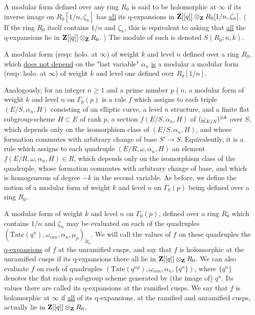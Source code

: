 A modular form defined over any ring $R_0$ is said to be holomorphic at
$\infty$ if its inverse image on $R_0[1/n,\zeta_n]$ has \uline{all} its
q-expansions in $\mathbf{Z}[[q]]\otimes_{\mathbf{Z}} R_0[1/n,\zeta_n]$. $\bigl\langle$ If the ring
$R_0$ itself contains $1/n$ and $\zeta_n$, this is equivalent to asking that
\uline{all} the q-expansions lie in $\mathbf{Z}[[q]]\otimes_{\mathbf{Z}} R_0$. $\bigr\rangle$ The
module of such is denoted $S(R_0;n,k)$.

A modular form (resp: holo. at $\infty$) of weight $k$ and level $n$ defined
over a ring $R_0$, which \uline{does not depend} on the "last variable"
$\alpha_n$ \uline{is} a modular a modular form (resp: holo. at $\infty$) of
weight $k$ and level one defined over $R_0[1/n]$.


Analogously, for an integer $n\geq 1$ and a prime number $p\nmid n$, a modular
form of weight $k$ and level $n$ on $\Gamma_0(p)$ is a rule $f$ which assigns
to each triple $(E/S,\alpha_n,H)$ consisting of an elliptic curve, a level $n$
structure, and a finite flat subgroup-scheme $H\subset E$ of rank $p$, a
section $f(E/S,\alpha_n,H)$ of $(\underline{\omega}_{E/S})^{\otimes k}$ over $S$, which depends
only on the isomorphism class of $(E/S,\alpha_n,H)$, and whose formation
commutes with arbitrary change of base $S'\to S$. Equivalently, it is a rule
which assigns to each quadruple $(E/R,\omega,\alpha_n,H)$ an element
$f(E/R,\omega,\alpha_n,H)\in R$, which depends only on the isomorphism class of
the quadruple, whose formation commutes with arbitrary change of base, and
which is homogeneous of degree $-k$ in the second variable. As before, we
define the notion of a modular form of weight $k$ and level $n$ on
$\Gamma_0(p)$ being defined over a ring $R_0$.

A modular form of weight $k$ and level $n$ on $\Gamma_0(p)$, defined over a ring
$R_0$ which contains $1/n$ and $\zeta_n$ may be evaluated on each of the
quadruples $(\mathrm{Tate}(q^n),\omega_{can},\alpha_n,\mu_p)_{R_0}$. We will
call the values of $f$ on these quadruples the \uline{q-expansions} of $f$ at
the unramified cusps, and say that $f$ is holomorphic at the unramified cusps
if its q-expansions there all lie in $\mathbf{Z}[[q]]\otimes_{\mathbf{Z}} R_0$. We can also
evaluate $f$ on each of quadruples
$(\mathrm{Tate}(q^{np}),\omega_{can},\alpha_n,\{q^n\})$, where $\{q^n\}$
denotes the flat rank-p subgroup scheme generated by (the image of) $q^n$. Its
values there are called its q-expansions at the ramified cusps. We say that $f$
is holomorphic at $\infty$ if \uline{all} of its q-expansions, at the ramified
and unramified cusps, actually lie in $\mathbf{Z}[[q]]\otimes_{\mathbf{Z}} R_0$.


